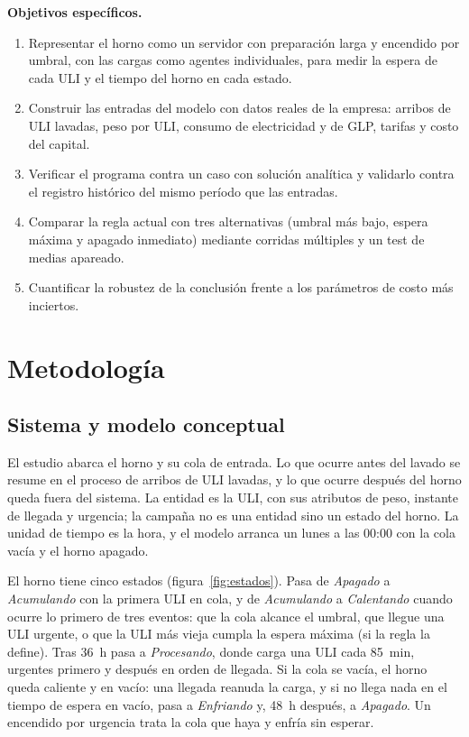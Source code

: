 \documentclass[a4paper,11pt]{article}
\begin{document}
\textbf{Objetivos específicos.}
\begin{enumerate}
  \item Representar el horno como un servidor con preparación larga y encendido por umbral, con las cargas como
        agentes individuales, para medir la espera de cada ULI y el tiempo del horno en cada estado.
  \item Construir las entradas del modelo con datos reales de la empresa: arribos de ULI lavadas, peso por
        ULI, consumo de electricidad y de GLP, tarifas y costo del capital.
  \item Verificar el programa contra un caso con solución analítica y validarlo contra el registro histórico
        del mismo período que las entradas.
  \item Comparar la regla actual con tres alternativas (umbral más bajo, espera máxima y apagado inmediato)
        mediante corridas múltiples y un test de medias apareado.
  \item Cuantificar la robustez de la conclusión frente a los parámetros de costo más inciertos.
\end{enumerate}

\section{Metodología}

\subsection{Sistema y modelo conceptual}

El estudio abarca el horno y su cola de entrada. Lo que ocurre antes del lavado se resume en el proceso de
arribos de ULI lavadas, y lo que ocurre después del horno queda fuera del sistema. La entidad es la ULI, con sus
atributos de peso, instante de llegada y urgencia; la campaña no es una entidad sino un estado del horno. La
unidad de tiempo es la hora, y el modelo arranca un lunes a las 00:00 con la cola vacía y el horno apagado.

El horno tiene cinco estados (figura~\ref{fig:estados}). Pasa de \emph{Apagado} a \emph{Acumulando} con la
primera ULI en cola, y de \emph{Acumulando} a \emph{Calentando} cuando ocurre lo primero de tres eventos: que la
cola alcance el umbral, que llegue una ULI urgente, o que la ULI más vieja cumpla la espera máxima (si la regla la
define). Tras 36~h pasa a \emph{Procesando}, donde carga una ULI cada 85~min, urgentes primero y después en orden
de llegada. Si la cola se vacía, el horno queda caliente y en vacío: una llegada reanuda la carga, y si no llega
nada en el tiempo de espera en vacío, pasa a \emph{Enfriando} y, 48~h después, a \emph{Apagado}. Un encendido por
urgencia trata la cola que haya y enfría sin esperar.
\end{document}
